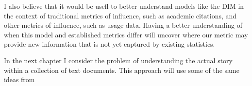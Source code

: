 I also believe that it would be usefl to better understand models like
the DIM in the context of traditional metrics of influence, such as
academic citations, and other metrics of influence, such as usage
data.  Having a better understanding of when this model and
established metrics differ will uncover where our metric may provide
new information that is not yet captured by existing statistics.

In the next chapter I consider the problem of understanding the actual
story within a collection of text documents.  This approach will use
some of the same ideas from

